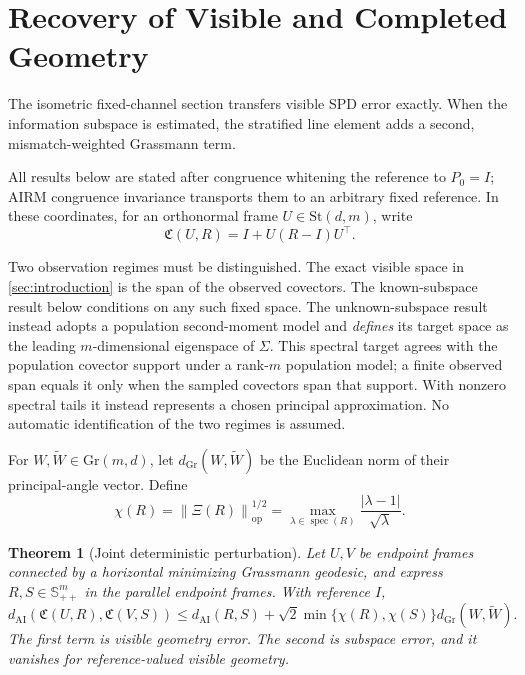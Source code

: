 \documentclass[10pt]{article}
\theoremstyle{plain}
\newtheorem{theorem}{Theorem}[section]
\theoremstyle{definition}
\theoremstyle{remark}
\newcommand{\SPD}{\mathbb S_{++}}
\newcommand{\AI}{\mathrm{AI}}
\newcommand{\Gr}{\mathrm{Gr}}
\newcommand{\St}{\mathrm{St}}
\newcommand{\opnorm}[1]{\left\lVert #1\right\rVert_{\operatorname{op}}}
\newcommand{\dai}{d_{\AI}}
\newcommand{\dgr}{d_{\Gr}}
\newcommand{\Cpl}{\mathfrak C}
\newcommand{\Xiop}{\Xi}
\begin{document}
\section{Recovery of Visible and Completed Geometry}
\label{sec:statistical-recovery}

The isometric fixed-channel section transfers visible SPD error exactly.  When
the information subspace is estimated, the stratified line element adds a
second, mismatch-weighted Grassmann term.

All results below are stated after congruence whitening the reference to
\(P_0=I\); AIRM congruence invariance transports them to an arbitrary fixed
reference.  In these coordinates, for an orthonormal frame
\(U\in\St(d,m)\), write
\begin{equation}
  \Cpl(U,R)=I+U(R-I)U^\top.
  \label{eq:normalized-completion}
\end{equation}

Two observation regimes must be distinguished.  The exact visible space in
\cref{sec:introduction} is the span of the observed covectors.  The
known-subspace result below conditions on any such fixed space.  The
unknown-subspace result instead adopts a population second-moment model and
\emph{defines} its target space as the leading \(m\)-dimensional eigenspace
of \(\Sigma\).  This spectral target agrees with the population covector
support under a rank-\(m\) population model; a finite observed span equals it
only when the sampled covectors span that support.  With nonzero spectral
tails it instead represents a chosen principal approximation.  No automatic
identification of the two regimes is assumed.

For \(W,\widetilde W\in\Gr(m,d)\), let \(\dgr(W,\widetilde W)\) be the
Euclidean norm of their principal-angle vector.  Define
\begin{equation}
  \chi(R)=\opnorm{\Xiop(R)}^{1/2}
  =\max_{\lambda\in\operatorname{spec}(R)}
  \frac{|\lambda-1|}{\sqrt\lambda}.
  \label{eq:chi}
\end{equation}

\begin{theorem}[Joint deterministic perturbation]
\label{thm:joint-perturbation}
Let \(U,V\) be endpoint frames connected by a horizontal minimizing
Grassmann geodesic, and express \(R,S\in\SPD^m\) in the parallel endpoint
frames.  With reference \(I\),
\begin{equation}
  \boxed{
  \dai(\Cpl(U,R),\Cpl(V,S))
  \le
  \dai(R,S)
  +\sqrt2\min\{\chi(R),\chi(S)\}\dgr(W,\widetilde W).}
  \label{eq:joint-perturbation}
\end{equation}
The first term is visible geometry error.  The second is subspace error, and
it vanishes for reference-valued visible geometry.
\end{theorem}
\end{document}
